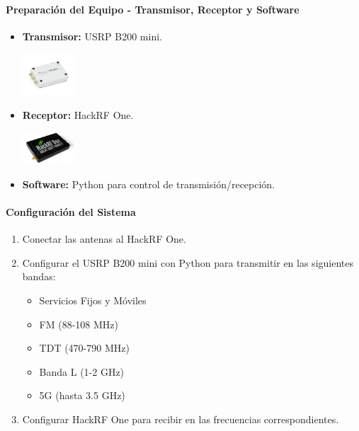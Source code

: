 \paragraph{Preparaci\'on del Equipo - Transmisor, Receptor y Software}
\begin{itemize}
	\item \textbf{Transmisor:} USRP B200 mini.
	\begin{center}
		\includegraphics[width=0.15\textwidth]{Figures/B200mini-Large_2.jpg}
	\end{center}
	
	\item \textbf{Receptor:} HackRF One.
	\begin{center}
		\includegraphics[width=0.15\textwidth]{Figures/h1-preliminary1-445.jpeg}
	\end{center}
	
	\item \textbf{Software:} Python para control de transmisi\'on/recepci\'on.
\end{itemize}


\paragraph{Configuraci\'on del Sistema}

\begin{enumerate}
	\item Conectar las antenas al HackRF One.
	\item Configurar el USRP B200 mini con Python para transmitir en las siguientes bandas:
	\begin{itemize}
		\item Servicios Fijos y M\'oviles
		\item FM (88-108 MHz)
		\item TDT (470-790 MHz)
		\item Banda L (1-2 GHz)
		\item 5G (hasta 3.5 GHz)
	\end{itemize}
	\item Configurar HackRF One para recibir en las frecuencias correspondientes.
\end{enumerate}


